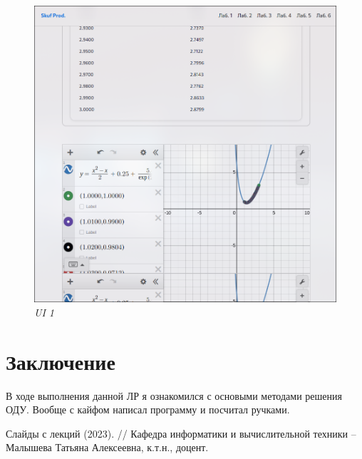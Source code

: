 \documentclass{article}
\begin{document}
             \begin{figure}[H] 
            	\begin{center}  
            		\includegraphics[scale=0.4]{ui2.png}
            		\caption{\small \sl {UI  1}}  
            	\end{center}  
            \end{figure}
            
\section{Заключение}
      В ходе выполнения данной ЛР я ознакомился с основыми методами решения ОДУ. Вообще с кайфом написал программу и посчитал ручками.

\begin{thebibliography}{9}
    Слайды с лекций (2023). // Кафедра информатики и вычислительной техники -- Малышева Татьяна Алексеевна, к.т.н., доцент.
\end{thebibliography} 
\end{document}
